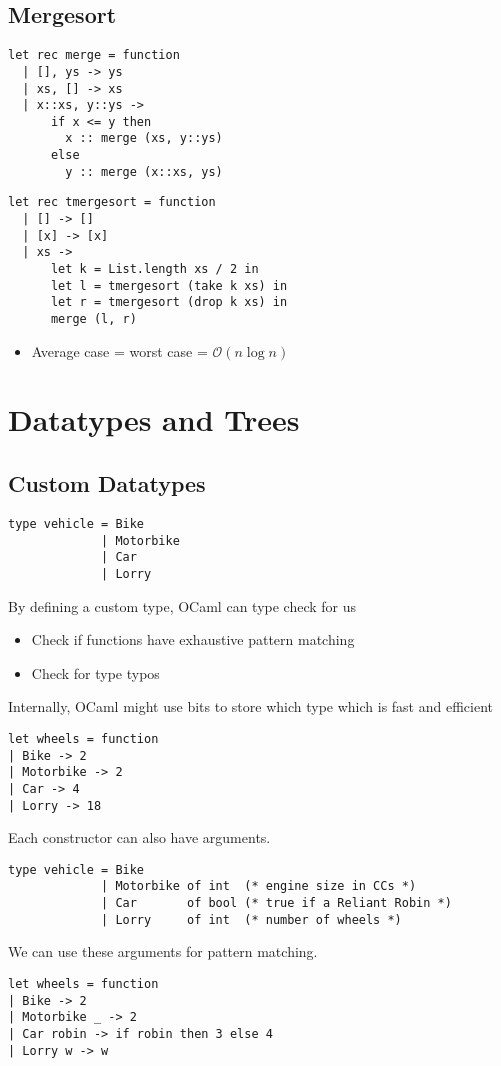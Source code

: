 \documentclass[12pt,a4paper]{article} %
\begin{document}
\subsection{Mergesort}
\begin{lstlisting}[language=caml]
let rec merge = function
  | [], ys -> ys
  | xs, [] -> xs
  | x::xs, y::ys ->
      if x <= y then
        x :: merge (xs, y::ys)
      else
        y :: merge (x::xs, ys)
\end{lstlisting}
\begin{lstlisting}[language=caml]
let rec tmergesort = function
  | [] -> []
  | [x] -> [x]
  | xs ->
      let k = List.length xs / 2 in
      let l = tmergesort (take k xs) in
      let r = tmergesort (drop k xs) in
      merge (l, r)
\end{lstlisting}
\begin{itemize}
\item Average case = worst case = $\mathcal{O}(n\log n)$
\end{itemize}
\section{Datatypes and Trees}
\subsection{Custom Datatypes}
\begin{lstlisting}[language=caml]
type vehicle = Bike
             | Motorbike
             | Car
             | Lorry
\end{lstlisting}
By defining a custom type, OCaml can type check for us
\begin{itemize}
\item Check if functions have exhaustive pattern matching
\item Check for type typos
\end{itemize}
Internally, OCaml might use bits to store which type which is fast and efficient
\begin{lstlisting}[language=caml]
let wheels = function
| Bike -> 2
| Motorbike -> 2
| Car -> 4
| Lorry -> 18
\end{lstlisting}
Each constructor can also have arguments.
\begin{lstlisting}[language=caml]
type vehicle = Bike
             | Motorbike of int  (* engine size in CCs *)
             | Car       of bool (* true if a Reliant Robin *)
             | Lorry     of int  (* number of wheels *)
\end{lstlisting}
We can use these arguments for pattern matching.
\begin{lstlisting}[language=caml]
let wheels = function
| Bike -> 2
| Motorbike _ -> 2
| Car robin -> if robin then 3 else 4
| Lorry w -> w
\end{lstlisting}
\end{document}
